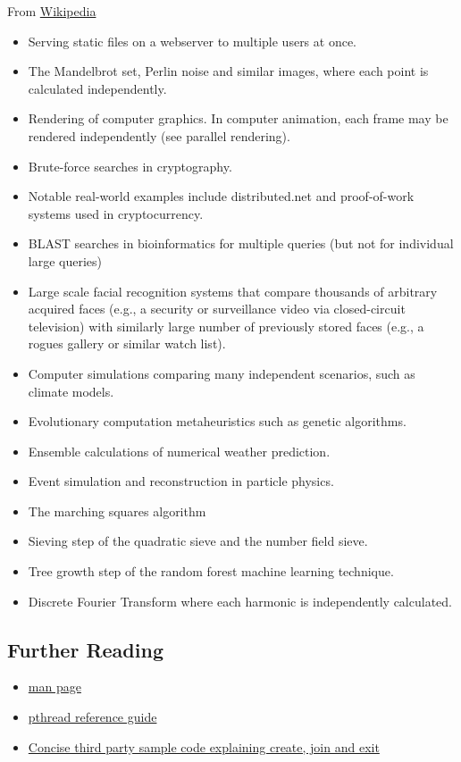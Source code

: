 From \href{https://en.wikipedia.org/wiki/Embarrassingly_parallel}{Wikipedia} 
\begin{itemize}
\tightlist
\item Serving static files on a webserver to multiple users at once. 
\item The Mandelbrot set, Perlin noise and similar images, where each point is calculated independently. 
\item Rendering of computer graphics. In computer animation, each frame may be rendered independently (see parallel rendering). 
\item Brute-force searches in cryptography.
\item Notable real-world examples include distributed.net and proof-of-work systems used in cryptocurrency. 
\item BLAST searches in bioinformatics for multiple queries (but not for individual large queries) 
\item Large scale facial recognition systems that compare thousands of arbitrary acquired faces (e.g., a security or surveillance video via closed-circuit television) with similarly large number of previously stored faces (e.g., a rogues gallery or similar watch list).
\item Computer simulations comparing many independent scenarios, such as climate models. 
\item Evolutionary computation metaheuristics such as genetic algorithms. 
\item Ensemble calculations of numerical weather prediction. 
\item Event simulation and reconstruction in particle physics. 
\item The marching squares algorithm 
\item Sieving step of the quadratic sieve and the number field sieve. 
\item Tree growth step of the random forest machine learning technique. 
\item Discrete Fourier Transform where each harmonic is independently calculated.
\end{itemize}

\subsection{Further Reading}

\begin{itemize}
\item \href{http://man7.org/linux/man-pages/man3/pthread_create.3.html}{man page} 
\item \href{http://man7.org/linux/man-pages/man7/pthreads.7.html}{pthread reference guide} 
\item \href{http://www.thegeekstuff.com/2012/04/terminate-c-thread/}{Concise third party sample code explaining create, join and exit}
\end{itemize}


